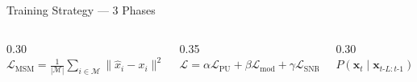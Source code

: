\documentclass[aspectratio=169, 10pt]{beamer}
\begin{document}
\begin{frame}{Training Strategy --- 3 Phases}
\small
\begin{columns}[T]
\begin{column}{0.30\textwidth}
\\[2pt]
$\displaystyle\mathcal{L}_\text{MSM}\!=\!\frac{1}{|\mathcal{M}|}\!\sum_{i \in \mathcal{M}}\!\|\hat{x}_i\!-\!x_i\|^2$
\end{column}
\begin{column}{0.35\textwidth}
\\[2pt]
$\mathcal{L} = \alpha\mathcal{L}_\text{PU} + \beta\mathcal{L}_\text{mod} + \gamma\mathcal{L}_\text{SNR}$
\end{column}
\begin{column}{0.30\textwidth}
\\[2pt]
$P(\mathbf{x}_t \mid \mathbf{x}_{t\text{-}L:t\text{-}1})$
\end{column}
\end{columns}
\end{frame}


\end{document}
